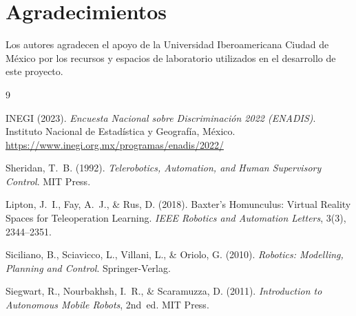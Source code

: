 \documentclass[12pt,letterpaper]{article}
\begin{document}
\section*{Agradecimientos}

Los autores agradecen el apoyo de la Universidad Iberoamericana Ciudad de México por
los recursos y espacios de laboratorio utilizados en el desarrollo de este proyecto.

\begin{thebibliography}{9}

INEGI (2023). \textit{Encuesta Nacional sobre Discriminación 2022 (ENADIS)}.
Instituto Nacional de Estadística y Geografía, México.
\url{https://www.inegi.org.mx/programas/enadis/2022/}

Sheridan, T.~B. (1992).
\textit{Telerobotics, Automation, and Human Supervisory Control}.
MIT Press.

Lipton, J.~I., Fay, A.~J., \& Rus, D. (2018).
Baxter's Homunculus: Virtual Reality Spaces for Teleoperation Learning.
\textit{IEEE Robotics and Automation Letters}, 3(3), 2344--2351.

Siciliano, B., Sciavicco, L., Villani, L., \& Oriolo, G. (2010).
\textit{Robotics: Modelling, Planning and Control}.
Springer-Verlag.

Siegwart, R., Nourbakhsh, I.~R., \& Scaramuzza, D. (2011).
\textit{Introduction to Autonomous Mobile Robots}, 2nd~ed.
MIT Press.

\end{thebibliography}
\end{document}
